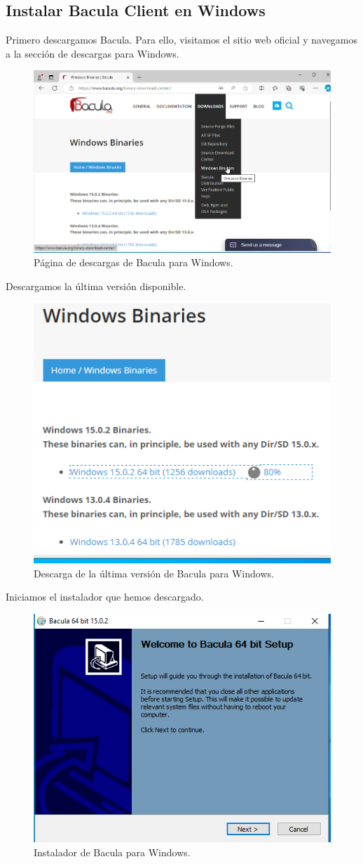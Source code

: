\subsection{Instalar Bacula Client en Windows}


Primero descargamos Bacula. Para ello, visitamos el sitio web oficial y navegamos a la sección de descargas para Windows.

\begin{figure}[H]
    \centering
    \includegraphics[width=0.5\linewidth]{instalacionBacula/winbinaries.png}
    \caption{Página de descargas de Bacula para Windows.}
\end{figure}

Descargamos la última versión disponible.

\begin{figure}[H]
    \centering
    \includegraphics[width=0.5\linewidth]{instalacionBacula/downloadwinbinaries.png}
    \caption{Descarga de la última versión de Bacula para Windows.}
\end{figure}

Iniciamos el instalador que hemos descargado.

\begin{figure}[H]
    \centering
    \includegraphics[width=0.5\linewidth]{instalacionBacula/instalador.png}
    \caption{Instalador de Bacula para Windows.}
\end{figure}

